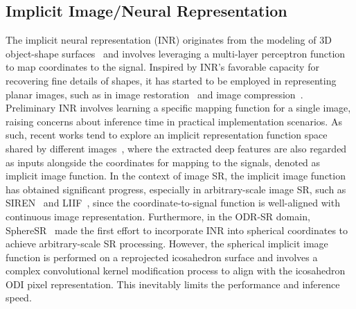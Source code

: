 \subsection{Implicit Image/Neural Representation}
The implicit neural representation (INR) originates from the modeling of 3D object-shape surfaces~\cite{atzmon2020sal,chen2019learning,michalkiewicz2019implicit} and involves leveraging a multi-layer perceptron function to map coordinates to the signal.
%
Inspired by INR's favorable capacity for recovering fine details of shapes, it has started to be employed in representing planar images, such as in image restoration~\cite{anokhin2021image,dupont2022generative,skorokhodov2021adversarial} and image compression~\cite{strumpler2022implicit}.
%
Preliminary INR involves learning a specific mapping function for a single image, raising concerns about inference time in practical implementation scenarios.
%
As such, recent works tend to explore an implicit representation function space shared by different images~\cite{chen2021learning,song2023ope,nguyen2023single}, where the extracted deep features are also regarded as inputs alongside the coordinates for mapping to the signals, denoted as implicit image function.
%
In the context of image SR, the implicit image function has obtained significant progress, especially in arbitrary-scale image SR, such as SIREN~\cite{sitzmann2020implicit} and LIIF~\cite{chen2021learning}, since the coordinate-to-signal function is well-aligned with continuous image representation.
%
Furthermore, in the ODR-SR domain, SphereSR~\cite{yoon2022spheresr} made the first effort to incorporate INR into spherical coordinates to achieve arbitrary-scale SR processing.
%
However, the spherical implicit image function is performed on a reprojected icosahedron surface and involves a complex convolutional kernel modification process to align with the icosahedron ODI pixel representation. This inevitably limits the performance and inference speed.